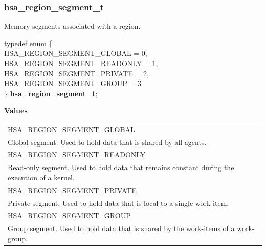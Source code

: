 \documentclass[final,oneside]{book}
\newcommand{\reftyp}[1]{#1}
\newcommand{\refenu}[1]{\reftyp{#1}}
\newenvironment{mylongtable}{\rowcolors{0}{lightgray}{lightgray}\longtable} {
\endlongtable}
\begin{document}
\subsubsection{hsa_\-region_\-segment_\-t}
\vspace{-2.5mm}Memory segments associated with a region.\begin{mylongtable}{@{}p{\textwidth}}
\rule{0pt}{3ex}typedef enum \{\\\hspace{1.7em}\hypertarget{group__memory_1gga8d508edc5ed47961e7169166ff92374cae6919a97f0a4ab274f7779f22d89cfd8}{\refenu{HSA_\-REGION_\-SEGMENT_\-GLOBAL}} = 0,\\
\hspace{1.7em}\hypertarget{group__memory_1gga8d508edc5ed47961e7169166ff92374ca8b287a82de4d63c805b01715d4e9c31e}{\refenu{HSA_\-REGION_\-SEGMENT_\-READONLY}} = 1,\\
\hspace{1.7em}\hypertarget{group__memory_1gga8d508edc5ed47961e7169166ff92374ca548406285039c897bbe62dd5202d1ea2}{\refenu{HSA_\-REGION_\-SEGMENT_\-PRIVATE}} = 2,\\
\hspace{1.7em}\hypertarget{group__memory_1gga8d508edc5ed47961e7169166ff92374cadbe54f04108f33bfc05193f35eb1ac70}{\refenu{HSA_\-REGION_\-SEGMENT_\-GROUP}} = 3\\
\} \hypertarget{group__memory_1ga8d508edc5ed47961e7169166ff92374c}{\textbf{hsa_\-region_\-segment_\-t}};\rule[-2ex]{0pt}{0pt}\end{mylongtable}\noindent\textbf{Values}\\[-7mm]
\begin{longtable}{@{\hspace{2em}}p{\linewidth-2em}}
\hspace{-2em}\refenu{HSA_\-REGION_\-SEGMENT_\-GLOBAL}\\Global segment. Used to hold data that is shared by all agents.\\[2mm]
\hspace{-2em}\refenu{HSA_\-REGION_\-SEGMENT_\-READONLY}\\Read-only segment. Used to hold data that remains constant during the execution of a kernel.\\[2mm]
\hspace{-2em}\refenu{HSA_\-REGION_\-SEGMENT_\-PRIVATE}\\Private segment. Used to hold data that is local to a single work-item.\\[2mm]
\hspace{-2em}\refenu{HSA_\-REGION_\-SEGMENT_\-GROUP}\\Group segment. Used to hold data that is shared by the work-items of a work-group.
\end{longtable}
\end{document}
